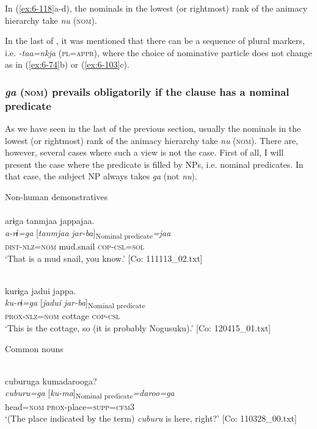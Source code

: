 In (\ref{ex:6-118}a-d), the nominals in the lowest (or rightmost) rank of the animacy hierarchy take \textit{nu} (\textsc{nom}).

  In the last of , it was mentioned that there can be a sequence of plural markers, i.e. \textit{-taa=nkja} (\textsc{pl}=\textsc{appr}), where the choice of nominative particle does not change as in (\ref{ex:6-74}b) or (\ref{ex:6-103}c).

\subsubsection{\textit{ga} (\textsc{nom}) prevails obligatorily if the clause has a nominal predicate}

As we have seen in the last of the previous section, usually the nominals in the lowest (or rightmost) rank of the animacy hierarchy take \textit{nu} (\textsc{nom}). There are, however, several cases where such a view is not the case. First of all, I will present the case where the predicate is filled by NPs, i.e. nominal predicates. In that case, the subject NP always takes \textit{ga} (not \textit{nu}).

\ea\label{ex:6-119}
 Non-human demonstratives\\

 \ea{}\\
{\TM}
\glll  arɨga  tanmjaa  jappajaa.\\
\textit{a-rɨ=ga}  [\textit{tanmjaa}  \textit{jar-ba}]\textsubscript{Nominal predicate}\textit{=jaa}\\
\textsc{dist}-\textsc{nlz}=\textsc{nom}  mud.snail  \textsc{cop}-\textsc{csl}=\textsc{sol}\\
\glt ‘That is a mud snail, you know.’ [Co: 111113\_02.txt]

\ex{}\\
{\TM}
\glll  kurɨga  jadui  jappa.\\
\textit{ku-rɨ=ga}  [\textit{jadui}  \textit{jar-ba}]\textsubscript{Nominal predicate}\\
\textsc{prox}-\textsc{nlz}=\textsc{nom}  cottage  \textsc{cop}-\textsc{csl}\\
\glt ‘This is the cottage, so (it is probably Nogusuku).’ [Co: 120415\_01.txt]

  Common nouns

\ex{}\\
{\TM}
\glll  cuburuga  kumadarooga?\\
\textit{cuburu=ga}  [\textit{ku-ma}]\textsubscript{Nominal predicate}\textit{=daroo=ga}\\
head=\textsc{nom}  \textsc{prox}-place=\textsc{supp}=\textsc{cfm}3\\
\glt ‘(The place indicated by the term) \textit{cuburu} is here, right?’ [Co: 110328\_00.txt]

